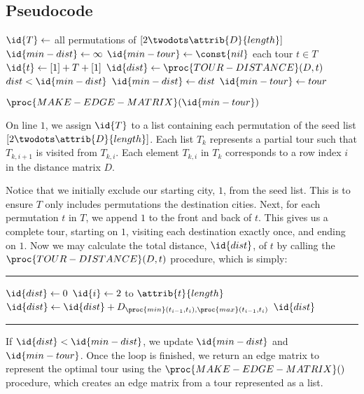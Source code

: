 \documentclass[11pt,fleqn]{article}
\begin{document}
\subsection{Pseudocode}
\begin{codebox}
\li $\id{T} \gets$ all permutations of $[2 \twodots \attrib{D}{length}]$
\li $\id{min-dist} \gets \infty$
\li $\id{min-tour} \gets \const{nil}$
\li \For each tour $t \in T$
\li   \Do
        $\id{t} \gets [1] + T + [1]$
\li       $\id{dist} \gets \proc{TOUR-DISTANCE}(D, t)$
\li	  \If $dist < \id{min-dist}$
\li	    \Then
              $\id{min-dist} \gets dist$
\li	      $\id{min-tour} \gets tour$
            \End
       \End

\li    \Return $\proc{MAKE-EDGE-MATRIX}(\id{min-tour})$
\end{codebox}
 
On line $1$, we assign $\id{T}$ to a list containing each permutation of
the seed list $[2 \twodots \attrib{D}{length}]$.  Each list $T_k$ represents
a partial tour such that $T_{k,i+1}$ is visited from $T_{k,i}$.  Each element
$T_{k,i}$ in $T_k$ corresponds to a row index $i$ in the distance matrix $D$.
\par

Notice that we initially exclude our starting city, $1$, from the seed list.
This is to ensure $T$ only includes permutations the destination cities. Next,
for each permutation $t$ in $T$, we append $1$ to the front and back of $t$.
This gives us a complete tour, starting on $1$, visiting each destination
exactly once, and ending on $1$.  Now we may calculate the total distance,
$\id{dist}$, of $t$ by calling the $\proc{TOUR-DISTANCE}(D, t)$ procedure,
which is simply:

\vspace{.27cm}
\hrule
\begin{codebox}
\li $\id{dist} \gets 0$
\li \For $\id{i} \gets 2$ to $\attrib{t}{length}$
\li   \Do
$\id{dist} \gets \id{dist} + D_{\proc{min}(t_{i-1}, t_i), \proc{max}(t_{i-1}, t_i)}$
       \End
\li    \Return $\id{dist}$
\end{codebox}
\vspace{.1cm}
\hrule
\vspace{.05cm}

If $\id{dist} < \id{min-dist}$, we update
$\id{min-dist}$ and $\id{min-tour}$.  Once the loop is finished, we
return an edge matrix to represent the optimal tour using the
$\proc{MAKE-EDGE-MATRIX}()$ procedure, which creates an edge matrix from a tour
represented as a list.
\par
\end{document}
